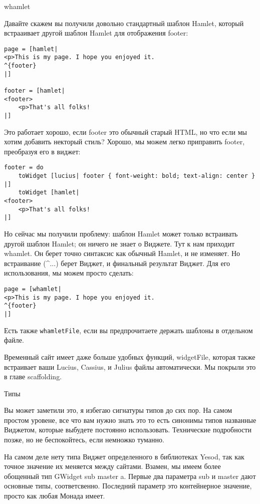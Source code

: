 whamlet

Давайте скажем вы получили довольно стандартный шаблон Hamlet, который встрааивает другой шаблон Hamlet для отображения footer:

\begin{lstlisting}
page = [hamlet|
<p>This is my page. I hope you enjoyed it.
^{footer}
|]

footer = [hamlet|
<footer>
    <p>That's all folks!
|]
\end{lstlisting}

Это работает хорошо, если footer это обычный старый HTML, но что если мы хотим добавить некторый стиль? Хорошо, мы можем легко приправить footer, преобразуя его в виджет:

\begin{lstlisting}
footer = do
    toWidget [lucius| footer { font-weight: bold; text-align: center } |]
    toWidget [hamlet|
<footer>
    <p>That's all folks!
|]
\end{lstlisting}

Но сейчас мы получили проблему: шаблон Hamlet может только встраивать другой шаблон Hamlet; он ничего не знает о Виджете. Тут к нам приходит whamlet. Он берет точно синтаксис как обычный Hamlet, и не изменяет. Но встраивание (^{...}) берет Виджет, и финальный результат Виджет. Для его использования, мы можем просто сделать:

\begin{lstlisting}
page = [whamlet|
<p>This is my page. I hope you enjoyed it.
^{footer}
|]
\end{lstlisting}


Есть также \lstinline'whamletFile', если вы предпрочитаете держать шаблоны в отдельном файле.

Временный сайт имеет даже больше удобных функций, widgetFile, которая также встраивает ваши Lucius, Cassius, и Julius файлы автоматически. Мы покрыли это в главе scaffolding.

Типы

Вы может заметили это, я избегаю сигнатуры типов до сих пор. На самом простом уровене, все что вам нужно знать это то есть синонимы типов названные Виджетом, которые выбудете постоянно использовать. Технические подробности позже, но не беспокойтесь, если немножко туманно.

На самом деле нету типа Виджет определенного в библиотеках Yesod, так как точное значение их меняется между сайтами. Взамен, мы имеем более обощенный тип GWidget sub master a. Первые два параметра sub и master дают основные типы, соответсвенно. Последний параметр это контейнерное значение, просто как любая Монада имеет.

